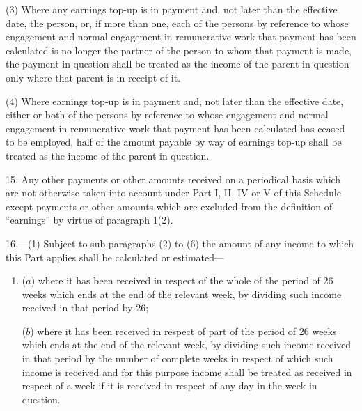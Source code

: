 \documentclass[12pt,a4paper]{article}
\begin{document}
(3) Where any earnings top-up is in payment and, not later than the effective date, the person, or, if more than one, each of the persons by reference to whose engagement and normal engagement in remunerative work that payment has been calculated is no longer the partner of the person to whom that payment is made, the payment in question shall be treated as the income of the parent in question only where that parent is in receipt of it.

(4) Where earnings top-up is in payment and, not later than the effective date, either or both of the persons by reference to whose engagement and normal engagement in remunerative work that payment has been calculated has ceased to be employed, half of the amount payable by way of earnings top-up shall be treated as the income of the parent in question.



\medskip

15.  Any other payments or other amounts received on a periodical basis which are not otherwise taken into account under Part I, II, IV or V of this Schedule
except payments or other amounts which are excluded from the definition of “earnings” by virtue of paragraph 1(2).  %


\medskip

16.—(1) Subject to sub-paragraphs (2) to (6) the amount of any income to which this Part applies shall be calculated or estimated—
\begin{enumerate}\item[]
($a$) where it has been received in respect of the whole of the period of 26 weeks which ends at the end of the relevant week, by dividing such income received in that period by 26;

($b$) where it has been received in respect of part of the period of 26 weeks which ends at the end of the relevant week, by dividing such income received in that period by the number of complete weeks in respect of which such income is received and for this purpose income shall be treated as received in respect of a week if it is received in respect of any day in the week in question.
\end{enumerate}
\end{document}
